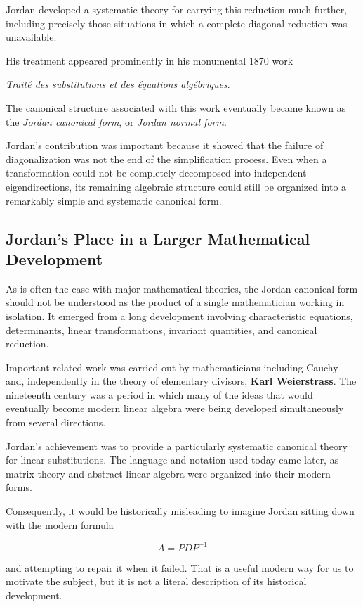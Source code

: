 \documentclass[11pt]{article}
\begin{document}
Jordan developed a systematic theory for carrying this reduction much
further, including precisely those situations in which a complete
diagonal reduction was unavailable.

His treatment appeared prominently in his monumental 1870 work

\begin{center}
\emph{Trait\'e des substitutions et des \'equations alg\'ebriques}.
\end{center}

The canonical structure associated with this work eventually became
known as the \emph{Jordan canonical form}, or \emph{Jordan normal
form}.

Jordan's contribution was important because it showed that the failure
of diagonalization was not the end of the simplification process.
Even when a transformation could not be completely decomposed into
independent eigendirections, its remaining algebraic structure could
still be organized into a remarkably simple and systematic canonical
form.

\subsection{Jordan's Place in a Larger Mathematical Development}

As is often the case with major mathematical theories, the Jordan
canonical form should not be understood as the product of a single
mathematician working in isolation.  It emerged from a long development
involving characteristic equations, determinants, linear
transformations, invariant quantities, and canonical reduction.

Important related work was carried out by mathematicians including
Cauchy and, independently in the theory of elementary divisors,
\textbf{Karl Weierstrass}.  The nineteenth century was a period in
which many of the ideas that would eventually become modern linear
algebra were being developed simultaneously from several directions.

Jordan's achievement was to provide a particularly systematic
canonical theory for linear substitutions.  The language and notation
used today came later, as matrix theory and abstract linear algebra
were organized into their modern forms.

Consequently, it would be historically misleading to imagine Jordan
sitting down with the modern formula

\[
A=PDP^{-1}
\]

and attempting to repair it when it failed.  That is a useful modern
way for us to motivate the subject, but it is not a literal description
of its historical development.
\end{document}
